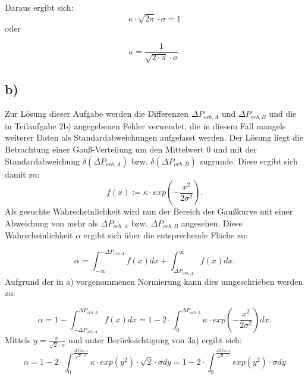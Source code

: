 \documentclass[titlepage]{scrartcl}
\begin{document}
Daraus ergibt sich: 
\begin{equation}
\kappa \cdot \sqrt{2\pi} \cdot \sigma = 1
\end{equation} oder


\begin{equation}
\kappa = \frac{1}{\sqrt{2\cdot \pi} \cdot \sigma}.
\end{equation}



\subsection{b)}
Zur Lösung dieser Aufgabe werden die Differenzen $\Delta P_{orb,A}$ und $\Delta P_{orb,B}$ und die in Teilaufgabe 2b) angegebenen Fehler verwendet, die in diesem Fall mangels weiterer Daten als Standardabweichungen aufgefasst werden.
Der Lösung liegt die Betrachtung einer Gauß-Verteilung um den Mittelwert 0 und mit der Standardabweichung $\delta (\Delta P_{orb,A})$ bzw. $\delta (\Delta P_{orb,B})$ zugrunde. 
Diese ergibt sich damit zu:
\begin{equation}
f(x) := \kappa \cdot exp(-\frac{x^2}{2\sigma^2}). 
\end{equation} 
Als gesuchte Wahrscheinlichkeit wird nun der Bereich der Gaußkurve mit einer Abweichung von mehr als $\Delta P_{orb,A}$ bzw. $\Delta P_{orb,B}$ angesehen. Diese Wahrscheinlichkeit $\alpha$ ergibt sich über die entsprechende Fläche zu: 

\begin{equation}
\alpha = \int_{-\infty} ^{-\Delta P_{orb,A}} f(x) dx + \int_{\Delta P_{orb,A}} ^{\infty} f(x) dx.
\end{equation}
Aufgrund der in a) vorgenommenen Normierung kann dies umgeschrieben werden zu: 

\begin{equation}
\alpha = 1 - \int_{-\Delta P_{orb,A}} ^{\Delta P_{orb,A}} f(x) dx = 1- 2\cdot \int_{0} ^{\Delta P_{orb,A}} \kappa \cdot exp(-\frac{x^2}{2\sigma^2}) dx. 
\end{equation}
Mittels $ y = \frac{x}{\sqrt{2} \cdot \sigma}$ und unter Berücksichtigung von 3a) ergibt sich:
\begin{equation}
\alpha = 1- 2\cdot \int_{0} ^{\frac{\Delta P_{orb,A}}{\sqrt{2}\cdot \sigma}} \kappa \cdot exp(y^2) \cdot \sqrt{2} \cdot \sigma dy = 1- 2\cdot \int_{0} ^{\frac{\Delta P_{orb,A}}{\sqrt{2}\cdot \sigma}} exp(y^2) \cdot \sigma dy
\end{equation}



\begin{comment}
\begin{thebibliography}{9}
\bibitem[Bec]{kmann} BECKMANN, Dieter. Astrophysik. C.C.Buchner, 2011.
\bibitem[Ort]{szeit} Wikipedia: Ortszeit. Online im Internet: URL: http://de.wikipedia.org/wiki/Ortszeit (Stand: 01.03.2014). 


\end{thebibliography}
\end{comment}
\end{document}
